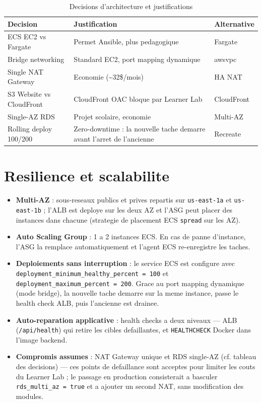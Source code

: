 \begin{table}[H]
    \centering
    \begin{tabularx}{\textwidth}{lXl}
        \toprule
        \textbf{Decision} & \textbf{Justification} & \textbf{Alternative} \\
        \midrule
        ECS EC2 vs Fargate & Permet Ansible, plus pedagogique & Fargate \\
        Bridge networking & Standard EC2, port mapping dynamique & awsvpc \\
        Single NAT Gateway & Economie (\~{}32\$/mois) & HA NAT \\
        S3 Website vs CloudFront & CloudFront OAC bloque par Learner Lab & CloudFront \\
        Single-AZ RDS & Projet scolaire, economie & Multi-AZ \\
        Rolling deploy 100/200 & Zero-downtime : la nouvelle tache demarre avant l'arret de l'ancienne & Recreate \\
        \bottomrule
    \end{tabularx}
    \caption{Decisions d'architecture et justifications}
\end{table}

\section{Resilience et scalabilite}

\begin{itemize}
    \item \textbf{Multi-AZ} : sous-reseaux publics et prives repartis sur
        \texttt{us-east-1a} et \texttt{us-east-1b} ; l'ALB est deploye sur les
        deux AZ et l'ASG peut placer des instances dans chacune
        (strategie de placement ECS \texttt{spread} sur les AZ).
    \item \textbf{Auto Scaling Group} : 1 a 2 instances ECS. En cas de panne
        d'instance, l'ASG la remplace automatiquement et l'agent ECS
        re-enregistre les taches.
    \item \textbf{Deploiements sans interruption} : le service ECS est configure
        avec \texttt{deployment\_minimum\_healthy\_percent = 100} et
        \texttt{deployment\_maximum\_percent = 200}. Grace au port mapping
        dynamique (mode bridge), la nouvelle tache demarre sur la meme instance,
        passe le health check ALB, puis l'ancienne est drainee.
    \item \textbf{Auto-reparation applicative} : health checks a deux niveaux ---
        ALB (\texttt{/api/health}) qui retire les cibles defaillantes, et
        \texttt{HEALTHCHECK} Docker dans l'image backend.
    \item \textbf{Compromis assumes} : NAT Gateway unique et RDS single-AZ
        (cf. tableau des decisions) --- ces points de defaillance sont acceptes
        pour limiter les couts du Learner Lab ; le passage en production
        consisterait a basculer \texttt{rds\_multi\_az = true} et a ajouter un
        second NAT, sans modification des modules.
\end{itemize}

